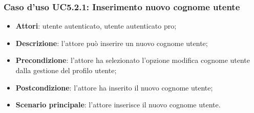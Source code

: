 \subsubsection{Caso d'uso UC5.2.1: Inserimento nuovo cognome utente}

\begin{itemize}
	\item \textbf{Attori}: utente autenticato, utente autenticato pro;
	\item \textbf{Descrizione}: l'attore può inserire un nuovo cognome utente;
	\item \textbf{Precondizione}:  l'attore ha selezionato l'opzione modifica cognome utente dalla gestione del profilo utente; 
	\item \textbf{Postcondizione}:  l'attore ha inserito il nuovo cognome utente;
	\item \textbf{Scenario principale}: l'attore inserisce il nuovo cognome utente.
\end{itemize}

